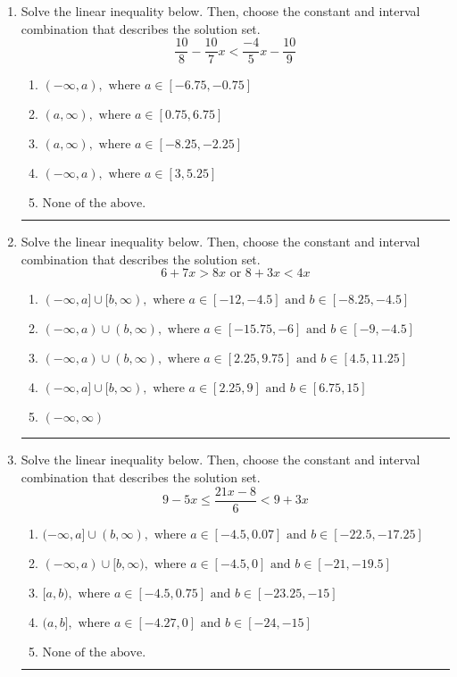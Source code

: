 \documentclass[14pt]{extbook}
\newcommand{\litem}[1]{\item#1\hspace*{-1cm}\rule{\textwidth}{0.4pt}}
\begin{document}
\begin{enumerate}
{\begin{enumerate}[label=\Alph*.]
\end{enumerate} }
\litem{
Solve the linear inequality below. Then, choose the constant and interval combination that describes the solution set.\[ \frac{10}{8} - \frac{10}{7} x < \frac{-4}{5} x - \frac{10}{9} \]\begin{enumerate}[label=\Alph*.]
\item \( (-\infty, a), \text{ where } a \in [-6.75, -0.75] \)
\item \( (a, \infty), \text{ where } a \in [0.75, 6.75] \)
\item \( (a, \infty), \text{ where } a \in [-8.25, -2.25] \)
\item \( (-\infty, a), \text{ where } a \in [3, 5.25] \)
\item \( \text{None of the above}. \)

\end{enumerate} }
\litem{
Solve the linear inequality below. Then, choose the constant and interval combination that describes the solution set.\[ 6 + 7 x > 8 x \text{ or } 8 + 3 x < 4 x \]\begin{enumerate}[label=\Alph*.]
\item \( (-\infty, a] \cup [b, \infty), \text{ where } a \in [-12, -4.5] \text{ and } b \in [-8.25, -4.5] \)
\item \( (-\infty, a) \cup (b, \infty), \text{ where } a \in [-15.75, -6] \text{ and } b \in [-9, -4.5] \)
\item \( (-\infty, a) \cup (b, \infty), \text{ where } a \in [2.25, 9.75] \text{ and } b \in [4.5, 11.25] \)
\item \( (-\infty, a] \cup [b, \infty), \text{ where } a \in [2.25, 9] \text{ and } b \in [6.75, 15] \)
\item \( (-\infty, \infty) \)

\end{enumerate} }
\litem{
Solve the linear inequality below. Then, choose the constant and interval combination that describes the solution set.\[ 9 - 5 x \leq \frac{21 x - 8}{6} < 9 + 3 x \]\begin{enumerate}[label=\Alph*.]
\item \( (-\infty, a] \cup (b, \infty), \text{ where } a \in [-4.5, 0.07] \text{ and } b \in [-22.5, -17.25] \)
\item \( (-\infty, a) \cup [b, \infty), \text{ where } a \in [-4.5, 0] \text{ and } b \in [-21, -19.5] \)
\item \( [a, b), \text{ where } a \in [-4.5, 0.75] \text{ and } b \in [-23.25, -15] \)
\item \( (a, b], \text{ where } a \in [-4.27, 0] \text{ and } b \in [-24, -15] \)
\item \( \text{None of the above.} \)

\end{enumerate} }
\end{enumerate}
\end{document}
